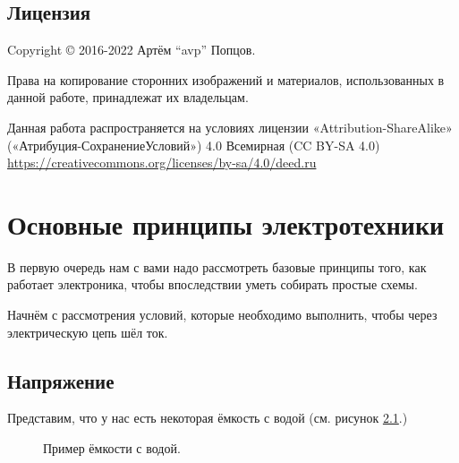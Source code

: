 \documentclass[a4paper,twoside]{book}
\begin{document}
\section{Лицензия}
Copyright © 2016-2022 Артём ``avp'' Попцов.

Права на копирование сторонних изображений и материалов, использованных в данной
работе, принадлежат их владельцам.

Данная работа распространяется на условиях лицензии «Attribution-ShareAlike»
(«Атрибуция-СохранениеУсловий») 4.0 Всемирная (CC BY-SA 4.0)
\url{https://creativecommons.org/licenses/by-sa/4.0/deed.ru}

\chapter{Основные принципы электротехники}

В первую очередь нам с вами надо рассмотреть базовые принципы того, как работает
электроника, чтобы впоследствии уметь собирать простые схемы.

Начнём с рассмотрения условий, которые необходимо выполнить, чтобы через
электрическую цепь шёл ток.

\section{Напряжение}

Представим, что у нас есть некоторая ёмкость с водой (см. рисунок
\ref{fig:electronics-current-0}.)

\begin{figure}[ht]
  \centering
  \caption{Пример ёмкости с водой.}
  \label{fig:electronics-current-0}
\end{figure}
\end{document}
